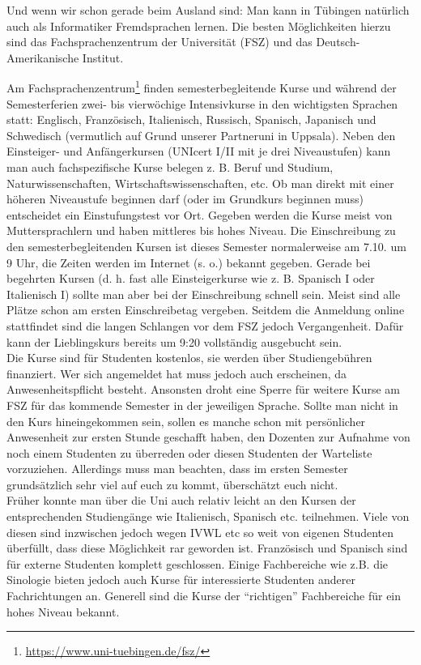 Und wenn wir schon gerade beim Ausland sind: Man kann in Tübingen
  natürlich auch als Informatiker Fremdsprachen lernen.  Die besten
  Möglichkeiten hierzu sind das Fachsprachenzentrum der
  Universität (FSZ) und das Deutsch-Amerikanische Institut.


Am Fachsprachenzentrum\footnote{\url{https://www.uni-tuebingen.de/fsz/}} finden
  semesterbegleitende Kurse und während der Semesterferien zwei- bis
  vierwöchige Intensivkurse in den wichtigsten Sprachen statt:
  Englisch, Französisch, Italienisch, Russisch, Spanisch, Japanisch und Schwedisch (vermutlich auf Grund unserer Partneruni in Uppsala). Neben den
  Einsteiger- und Anfängerkursen (UNIcert I/II mit je drei
  Niveaustufen) kann man auch fachspezifische Kurse belegen
  z. B. Beruf und Studium, Naturwissenschaften,
  Wirtschaftswissenschaften, etc.  Ob man direkt mit einer höheren
  Niveaustufe beginnen darf (oder im Grundkurs beginnen muss)
  entscheidet ein Einstufungstest vor Ort.  Gegeben werden die Kurse
  meist von Muttersprachlern und haben mittleres bis hohes Niveau.
  Die Einschreibung zu den semesterbegleitenden Kursen ist dieses Semester normalerweise am 7.10. um 9 Uhr, die Zeiten werden im
  Internet (s. o.) bekannt gegeben.  Gerade bei begehrten Kursen
  (d. h. fast alle Einsteigerkurse wie z. B. Spanisch I oder
  Italienisch I) sollte man aber bei der  Einschreibung schnell sein.
  Meist sind alle Plätze schon am ersten Einschreibetag vergeben. Seitdem die Anmeldung online stattfindet sind die langen Schlangen vor dem FSZ jedoch Vergangenheit. Dafür kann der Lieblingskurs bereits um 9:20 vollständig ausgebucht sein.\\
  Die Kurse sind für Studenten kostenlos, sie werden über Studiengebühren finanziert. Wer sich angemeldet hat muss jedoch auch erscheinen, da Anwesenheitspflicht besteht. Ansonsten droht eine Sperre für weitere Kurse am FSZ für das kommende Semester in der jeweiligen Sprache. Sollte man nicht in den Kurs hineingekommen sein, sollen es manche schon mit persönlicher Anwesenheit zur ersten Stunde geschafft haben, den Dozenten zur Aufnahme von noch einem Studenten zu überreden oder diesen Studenten der Warteliste vorzuziehen. Allerdings muss man beachten, dass im ersten Semester grundsätzlich sehr viel auf euch zu kommt, überschätzt euch nicht.\\

Früher konnte man über die Uni auch relativ leicht an den Kursen der entsprechenden Studiengänge wie Italienisch, Spanisch etc. teilnehmen. Viele von diesen sind inzwischen jedoch wegen IVWL etc so weit von eigenen Studenten überfüllt, dass diese Möglichkeit rar geworden ist. Französisch und Spanisch sind für externe Studenten komplett geschlossen. Einige Fachbereiche wie z.B. die Sinologie bieten jedoch auch Kurse für interessierte Studenten anderer Fachrichtungen an.  Generell sind die Kurse der "`richtigen"' Fachbereiche für ein hohes Niveau bekannt.
  
